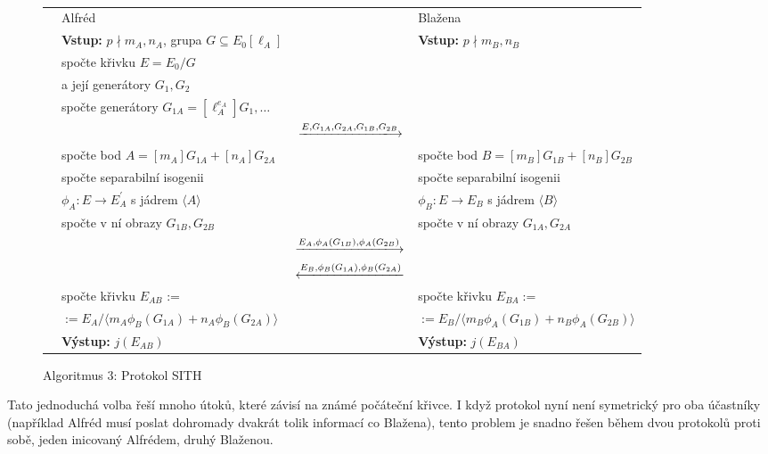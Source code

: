 \documentclass[12pt]{report}
\begin{document}
\begin{figure}[h]
\begin{center}
\vspace{-0.25cm}
\makebox[\linewidth]{\rule{17.3cm}{0.4pt}}\\
\vspace{0.2cm}
\hspace*{-1cm}\begin{tabular}{l l c l}
 \cline{2-2} \cline{4-4} 
& Alfréd & & Blažena \\ 
\cline{2-2} \cline{4-4} 
& \textbf{Vstup:} $p \nmid m_A,n_A$, grupa $G \subseteq E_0[\ell_A]$ & & \textbf{Vstup:} $p \nmid m_B,n_B$ \\
&spočte křivku $E = E_0/G$ & &\\
&a její generátory $G_1,G_2$ & &\\
&spočte generátory $G_{1A} = [\ell_A ^{e_A}] G_1,\dots$ & &\\
 & & $\xlongrightarrow{E,G_{1A},G_{2A},G_{1B},G_{2B}}$  &  \\
&spočte bod $A = [m_A]G_{1A}+[n_A]G_{2A}$ & & spočte bod $B = [m_B]G_{1B}+[n_B]G_{2B}$\\
&spočte separabilní isogenii& &spočte separabilní isogenii\\
&$\phi_A : E \longrightarrow E_A ^\prime$ s jádrem $\langle A\rangle$ & &$\phi_B : E \longrightarrow E_B$ s jádrem $\langle B\rangle$\\
&spočte v ní obrazy $G_{1B},G_{2B}$& &spočte  v ní obrazy $G_{1A},G_{2A}$\\
 & & $\xlongrightarrow{E_A, \phi_A (G_{1B}), \phi_A (G_{2B})}$  &  \\
&  & $\xlongleftarrow{E_B, \phi_B (G_{1A}), \phi_B (G_{2A})} $ &  \\
& spočte křivku $E_{AB}$ := & & spočte křivku $E_{BA} :=$\\
& $:= E_A/\langle m_A \phi_B (G_{1A})+ n_A \phi_B (G_{2A}) \rangle$ &  & $ := E_B/\langle m_B \phi_A (G_{1B})+ n_B \phi_A (G_{2B}) \rangle$ \\
& \textbf{Výstup:} $j(E_{AB})$ & & \textbf{Výstup:} $j(E_{BA})$
\end{tabular}
\caption*{Algoritmus 3: Protokol SITH}
\end{center}
\end{figure}

Tato jednoduchá volba řeší mnoho útoků, které závisí na známé počáteční křivce. I když protokol nyní není symetrický pro oba účastníky (například Alfréd musí poslat dohromady dvakrát tolik informací co Blažena), tento problem je snadno řešen během dvou protokolů proti sobě, jeden inicovaný Alfrédem, druhý Blaženou.
\end{document}
